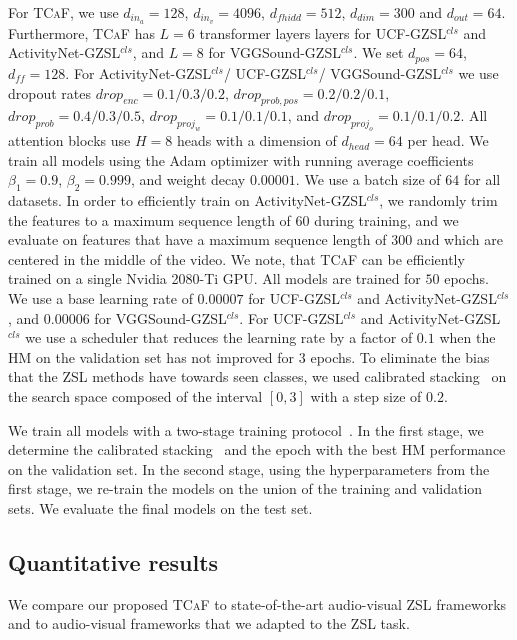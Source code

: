 \documentclass[runningheads]{llncs}
\newcommand{\mypara}[1]{\noindent{\bf{#1}}}
\newcommand{\modelName}{\textsc{TCaF}\xspace}
\newcommand{\activity}{{ActivityNet-GZSL$^{cls}$}\xspace}
\newcommand{\ucf}{{UCF-GZSL$^{cls}$}\xspace}
\newcommand{\vgg}{{VGGSound-GZSL$^{cls}$}\xspace}
\begin{document}
\mypara{Implementation details.} 
For \modelName, we use $d_{in_a}=128$, $d_{in_v}=4096$, $d_{fhidd}=512$, $d_{dim}=300$ and $d_{out}=64$. Furthermore, \modelName has $L=6$ transformer layers layers for \ucf and \activity, and $L=8$ for \vgg. We set $d_{pos}=64 $, $d_{ff}=128$. For \activity / \ucf / \vgg we use dropout rates $drop_{enc}=0.1/0.3/0.2$, $drop_{prob,pos}=0.2/0.2/0.1$, $drop_{prob}=0.4/0.3/0.5$, $drop_{proj_w}=0.1/0.1/0.1$, and $drop_{proj_o}=0.1/0.1/0.2$. All attention blocks use $H=8$ heads with a dimension of $d_{head}=64$ per head. 
We train all models using the Adam optimizer \cite{kingma2014adam} with running average coefficients $\beta_1=0.9$, $\beta_2=0.999$, and weight decay $0.00001$. We use a batch size of $64$ for all datasets. 
In order to efficiently train on \activity, we randomly trim the features to a maximum sequence length of 60 during training, and we evaluate on features that have a maximum sequence length of 300 and which are centered in the middle of the video. We note, that \modelName{} can be efficiently trained on a single Nvidia 2080-Ti GPU.
All models are trained for $50$ epochs.  We use a base learning rate of $0.00007$ for \ucf and \activity, and $0.00006$ for \vgg. For \ucf and \activity we use a scheduler that reduces the learning rate by a factor of $0.1$ when the HM on the validation set has not improved for $3$ epochs. To eliminate the bias that the ZSL methods have towards seen classes, we used calibrated stacking~\cite{chao2016empirical} on the search space composed of the interval $[0,3]$ with a step size of $0.2$. 

We train all models with a two-stage training protocol~\cite{mercea2022}. In the first stage, we determine the calibrated stacking~\cite{chao2016empirical} and the epoch with the best HM performance on the validation set. In the second stage, using the hyperparameters from the first stage, we re-train the models on the union of the training and validation sets. We evaluate the final models on the test set.




\subsection{Quantitative results}\label{sec:sota}
We compare our proposed \modelName to state-of-the-art audio-visual ZSL frameworks and to audio-visual frameworks that we adapted to the ZSL task. 
\end{document}
